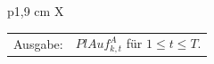 \documentclass[13pt,a4paper, listof=entryprefix, bibliography=totocnumbered,toc=listofnumbered,lof=listofnumbered]{scrartcl}
\begin{document}
\begin{algorithmic}
\begin{tabularx}{\linewidth}{p{1,9 cm} X}
	\end{tabularx}
	\addtocounter{table}{-1} %
	\begin{tabularx}{\linewidth}{p{1.9 cm}X}
		\hspace*{1 mm} Ausgabe: & $PlAuf^{A}_{k,t}$ für $1 \le t \le T$.
	\end{tabularx}
	\addtocounter{table}{-1} %
\end{algorithmic}

\vspace{\baselineskip}

\end{document}
